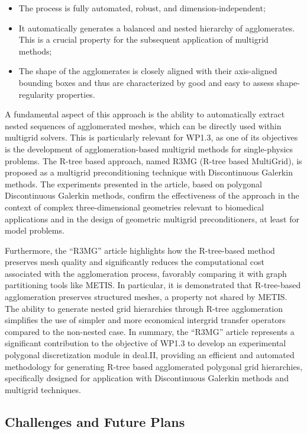 \documentclass[a4paper,12pt]{article}
\begin{document}
\begin{itemize}
    \item 
    The process is fully automated, robust, and dimension-independent;
    \item It automatically generates a
balanced and nested hierarchy of agglomerates. This is a crucial property for
the subsequent application of multigrid methods;
\item The shape of the agglomerates is closely aligned with their axis-aligned bounding boxes and thus are characterized by good and easy to assess  shape-regularity properties.
\end{itemize}

A fundamental aspect of this approach is the ability to automatically extract
nested sequences of agglomerated meshes, which can be directly used within
multigrid solvers. This is particularly relevant for WP1.3, as one of its
objectives is the development of agglomeration-based multigrid methods for
single-physics problems. The R-tree based approach, named R3MG (R-tree based
MultiGrid), is proposed as a multigrid preconditioning technique with
Discontinuous Galerkin methods. The experiments presented in the article, based
on polygonal Discontinuous Galerkin methods, confirm the effectiveness of the
approach in the context of complex three-dimensional geometries relevant to biomedical applications and in the
design of geometric multigrid preconditioners, at least for model problems.

Furthermore, the ``R3MG'' article highlights how the R-tree-based method preserves
mesh quality and significantly reduces the computational cost associated with
the agglomeration process, favorably comparing it with graph partitioning tools
like METIS. In particular, it is demonstrated that R-tree-based agglomeration
preserves structured meshes, a property not shared by METIS. The ability to
generate nested grid hierarchies through R-tree agglomeration simplifies the use
of simpler and more economical intergrid transfer operators compared to the
non-nested case. In summary, the ``R3MG'' article represents a significant
contribution to the objective of WP1.3 to develop an experimental polygonal
discretization module in deal.II, providing an efficient and automated
methodology for generating R-tree based agglomerated polygonal grid hierarchies,
specifically designed for application with Discontinuous Galerkin methods and
multigrid techniques.



 \subsection{Challenges and Future Plans}
\end{document}
